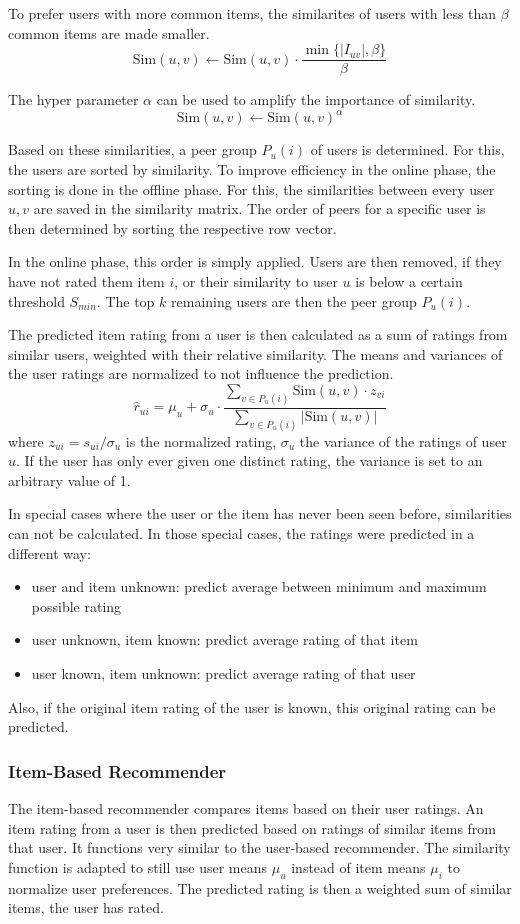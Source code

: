 \documentclass[11pt]{scrartcl}
\newcommand{\set}[1]{\{#1\}}
\newcommand{\abs}[1]{\left\vert #1 \right\vert}
\begin{document}
To prefer users with more common items, the similarites of users with less than $\beta$ common items are made smaller.
$$\text{Sim}(u, v) \gets \text{Sim}(u, v) \cdot \frac{\min\set{\abs{I_{uv}}, \beta}}{\beta}$$

The hyper parameter $\alpha$ can be used to amplify the importance of similarity.
$$\text{Sim}(u, v) \gets \text{Sim}(u, v)^\alpha$$

Based on these similarities, a peer group $P_u(i)$ of users is determined. For this, the users are sorted by similarity.
To improve efficiency in the online phase, the sorting is done in the offline phase.
For this, the similarities between every user $u, v$ are saved in the similarity matrix.
The order of peers for a specific user is then determined by sorting the respective row vector.

In the online phase, this order is simply applied. Users are then removed, if they have not rated them item $i$, or their similarity to user $u$ is below a certain threshold $S_{min}$.
The top $k$ remaining users are then the peer group $P_u(i)$.

The predicted item rating from a user is then calculated as a sum of ratings from similar users, weighted with their relative similarity.
The means and variances of the user ratings are normalized to not influence the prediction.
$$\hat{r}_{ui} = \mu_u + \sigma_u \cdot \frac{\sum\limits_{v \in P_u(i)} \text{Sim}(u, v) \cdot z_{vi}}{\sum\limits_{v \in P_u(i)} \abs{\text{Sim}(u, v)}}$$
where $z_{ui} = s_{ui} / \sigma_u$ is the normalized rating, $\sigma_u$ the variance of the ratings of user $u$.
If the user has only ever given one distinct rating, the variance is set to an arbitrary value of 1.

\hypertarget{special_cases}{}
In special cases where the user or the item has never been seen before, similarities can not be calculated. In those special cases, the ratings were predicted in a different way:
\begin{itemize}
	\item user and item unknown: predict average between minimum and maximum possible rating
	\item user unknown, item known: predict average rating of that item
	\item user known, item unknown: predict average rating of that user
\end{itemize}
Also, if the original item rating of the user is known, this original rating can be predicted.

\subsubsection[Item-Based]{Item-Based Recommender}
The item-based recommender compares items based on their user ratings. An item rating from a user is then predicted based on ratings of similar items from that user.
It functions very similar to the user-based recommender. The similarity function is adapted to still use user means $\mu_u$ instead of item means $\mu_i$ to normalize user preferences.
The predicted rating is then a weighted sum of similar items, the user has rated.
\end{document}
